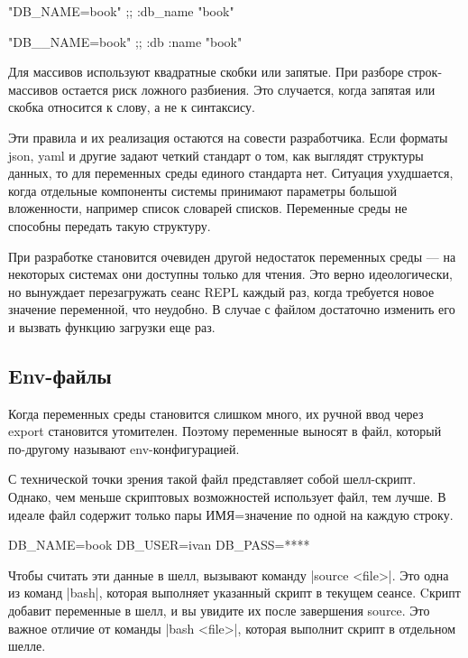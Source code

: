 \begin{code}
"DB_NAME=book"
;; {:db_name "book"}

"DB__NAME=book"
;; {:db {:name "book"}}
\end{code}

Для массивов используют квадратные скобки или запятые. При разборе
строк-массивов остается риск ложного разбиения. Это случается, когда запятая или
скобка относится к слову, а не к синтаксису.

Эти правила и их реализация остаются на совести разработчика. Если форматы json,
yaml и другие задают четкий стандарт о том, как выглядят структуры данных, то
для переменных среды единого стандарта нет. Ситуация ухудшается, когда отдельные
компоненты системы принимают параметры большой вложенности, например список
словарей списков. Переменные среды не способны передать такую структуру.

При разработке становится очевиден другой недостаток переменных среды — на
некоторых системах они доступны только для чтения. Это верно идеологически, но
вынуждает перезагружать сеанс REPL каждый раз, когда требуется новое значение
переменной, что неудобно. В случае с файлом достаточно изменить его и вызвать
функцию загрузки еще раз.

\subsection{Env-файлы}

Когда переменных среды становится слишком много, их ручной ввод через export
становится утомителен. Поэтому переменные выносят в файл, который по-другому
называют env-конфигурацией.

С технической точки зрения такой файл представляет собой шелл-скрипт. Однако,
чем меньше скриптовых возможностей использует файл, тем лучше. В идеале файл
содержит только пары ИМЯ=значение по одной на каждую строку.

\begin{code}
DB_NAME=book
DB_USER=ivan
DB_PASS=****
\end{code}

Чтобы считать эти данные в шелл, вызывают команду \spverb|source <file>|. Это одна из
команд \spverb|bash|, которая выполняет указанный скрипт в текущем сеансе. Cкрипт
добавит переменные в шелл, и вы увидите их после завершения source. Это важное
отличие от команды \spverb|bash <file>|, которая выполнит скрипт в отдельном шелле.


